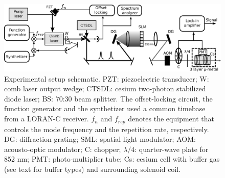 \documentclass[%
aps,
prl,
showpacs,
twocolumn,
]{revtex4}
\begin{document}
\begin{figure}
  \centering
  \includegraphics[scale=0.4]{experiment_big.eps}
  \caption{Experimental setup schematic. PZT: piezoelectric transducer; W: comb laser output wedge; CTSDL: cesium two-photon stabilized diode laser; BS: 70:30 beam splitter. The offset-locking circuit, the function generator and the synthetizer used a common timebase from a LORAN-C receiver. $f_n$ and $f_{rep}$ denotes the equipment that controls the mode frequency and the repetition rate, respectively. DG: diffraction grating; SML: spatial light modulator; AOM: acousto-optic modulator; C: chopper; $\lambda/4$: quarter-wave plate for 852 nm; PMT: photo-multiplier tube; Cs: cesium cell with buffer gas (see text for buffer types) and surrounding solenoid coil.}
  \label{fig:experiment}
\end{figure}
\end{document}
